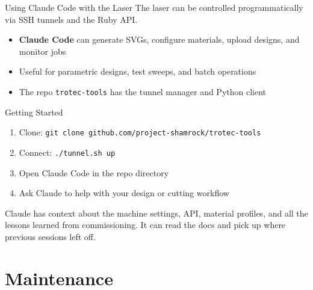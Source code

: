 \documentclass[aspectratio=169]{beamer}
\begin{document}
\begin{frame}{Using Claude Code with the Laser}
The laser can be controlled programmatically via SSH tunnels and the Ruby API.

\vspace{0.5em}
\begin{itemize}
    \item \textbf{Claude Code} can generate SVGs, configure materials,
        upload designs, and monitor jobs
    \item Useful for parametric designs, test sweeps, and batch operations
    \item The repo \texttt{trotec-tools} has the tunnel manager and Python client
\end{itemize}

\vspace{0.5em}
\begin{block}{Getting Started}
\begin{enumerate}
    \item Clone: \texttt{git clone github.com/project-shamrock/trotec-tools}
    \item Connect: \texttt{./tunnel.sh up}
    \item Open Claude Code in the repo directory
    \item Ask Claude to help with your design or cutting workflow
\end{enumerate}
\end{block}

\vspace{0.5em}
{\small Claude has context about the machine settings, API, material profiles,
and all the lessons learned from commissioning. It can read the docs and
pick up where previous sessions left off.}
\end{frame}

\section{Maintenance}
\end{document}
